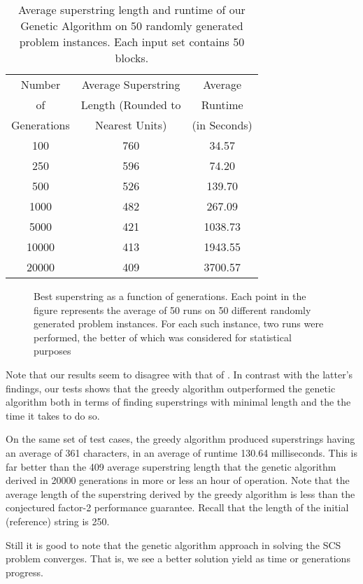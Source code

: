 \begin{table}
\centering
\begin{tabular}{|c|c|c|}
\hline
Number  & Average Superstring  & Average  \\
 of& Length (Rounded to & Runtime \\
Generations& Nearest Units) & (in Seconds) \\
\hline
\hline
100		& 760	& 34.57		\\
250		& 596	& 74.20		\\
500		& 526	& 139.70	\\
1000	& 482	& 267.09	\\
5000	& 421	& 1038.73	\\
10000	& 413	& 1943.55	\\
20000	& 409	& 3700.57	\\
\hline
\end{tabular}
\caption{
Average superstring length and runtime of our Genetic Algorithm
on 50 randomly generated problem instances. Each input set contains
50 blocks.}
\label{tbl:resultsga}
\end{table}


\begin{figure*}[ht!]
\centering
{}
\caption{Best superstring as a function of generations. Each point in the figure represents the average of 50
runs on 50 different randomly generated problem instances. For each such instance, two runs were performed, the better
of which was considered for statistical purposes}
\label{fig-results}
\end{figure*}

Note that our results seem to disagree with that of \cite{Zaritsky2004}.
In contrast with the latter's findings, our tests shows that
the greedy algorithm outperformed the genetic algorithm both in terms of finding superstrings
with minimal length and the the time it takes to do so.

On the same set of test cases, the greedy algorithm
produced superstrings having an average of 361 characters, 
in an average of runtime 130.64 milliseconds. This is far better than
the 409 average superstring length that the genetic algorithm
derived in 20000 generations in more or less an hour of operation. 
Note that the average length of the superstring derived by the greedy algorithm is
less than the conjectured factor-2 performance guarantee.
Recall that the length of the initial (reference) string is 250.

Still it is good to note that the genetic algorithm approach
in solving the SCS problem converges. That is, we see a better solution
yield as time or generations progress. 